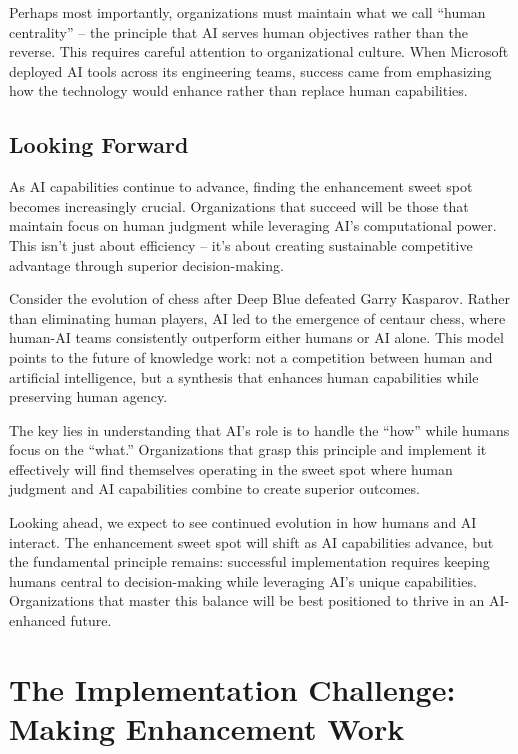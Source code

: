 \documentclass[
  Letterpaper,
]{scrbook}
\begin{document}
Perhaps most importantly, organizations must maintain what we call
``human centrality'' -- the principle that AI serves human objectives
rather than the reverse. This requires careful attention to
organizational culture. When Microsoft deployed AI tools across its
engineering teams, success came from emphasizing how the technology
would enhance rather than replace human capabilities.

\section{Looking Forward}\label{looking-forward}

As AI capabilities continue to advance, finding the enhancement sweet
spot becomes increasingly crucial. Organizations that succeed will be
those that maintain focus on human judgment while leveraging AI's
computational power. This isn't just about efficiency -- it's about
creating sustainable competitive advantage through superior
decision-making.

Consider the evolution of chess after Deep Blue defeated Garry Kasparov.
Rather than eliminating human players, AI led to the emergence of
centaur chess, where human-AI teams consistently outperform either
humans or AI alone. This model points to the future of knowledge work:
not a competition between human and artificial intelligence, but a
synthesis that enhances human capabilities while preserving human
agency.

The key lies in understanding that AI's role is to handle the ``how''
while humans focus on the ``what.'' Organizations that grasp this
principle and implement it effectively will find themselves operating in
the sweet spot where human judgment and AI capabilities combine to
create superior outcomes.

Looking ahead, we expect to see continued evolution in how humans and AI
interact. The enhancement sweet spot will shift as AI capabilities
advance, but the fundamental principle remains: successful
implementation requires keeping humans central to decision-making while
leveraging AI's unique capabilities. Organizations that master this
balance will be best positioned to thrive in an AI-enhanced future.


\chapter{The Implementation Challenge: Making Enhancement
Work}\label{the-implementation-challenge-making-enhancement-work}
\end{document}
